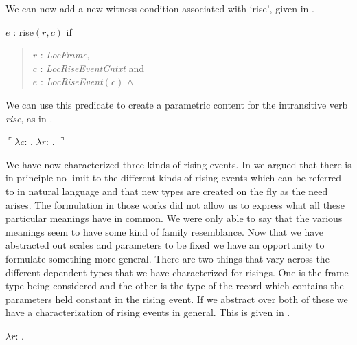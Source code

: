 We can now add a new witness condition associated with `rise', given
in \nexteg{}.
\begin{ex} 
  $e$ : rise$(r,c)$ if
  \begin{quote}
    $r$ : \textit{LocFrame},\\
    $c$ : \textit{LocRiseEventCntxt} and \\
    $e$ : \textit{LocRiseEvent}$(c)$ \d{$\wedge$}
  \end{quote}
  
\end{ex}
We can use this predicate to create a parametric content for the
intransitive verb \textit{rise}, as in \nexteg{}.
\begin{ex} 
  $\ulcorner\lambda c$: .
  $\lambda r$: . $\urcorner$
\end{ex}

We have now characterized three kinds of rising events.  In
\cite{Cooper2010,Cooper2012}  we argued that there is in principle no
limit to the different kinds of rising events which can be referred to
in natural language and that new types are created on the fly as the
need arises.  The formulation in those works did not allow us to
express what all these particular meanings have in common.  We were
only able to say that the various meanings seem to have some kind of
family resemblance. Now that we have abstracted out scales and
parameters to be fixed we have an opportunity to formulate something
more general.  There are two things that vary across the different
dependent types that we have characterized for risings.  One is the
frame type being considered and the other is the type of the record which
contains the parameters held constant in the rising event. If we
abstract over both of these we have a characterization of rising
events in general. This is given in \nexteg{}.
\begin{ex} 
$\lambda
r$: .\\  
\hspace*{2em}  
\end{ex}

